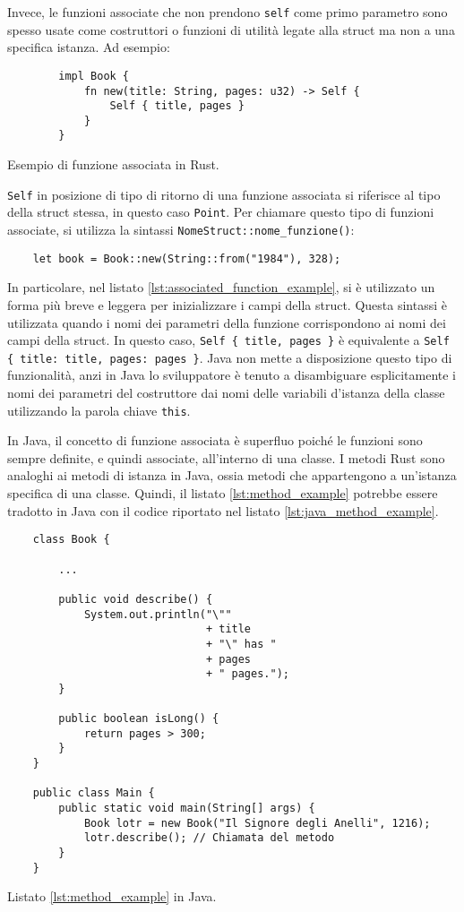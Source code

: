 Invece, le funzioni associate che non prendono \texttt{self} come primo parametro sono spesso usate come costruttori o funzioni di utilità legate alla struct ma non a una specifica istanza. Ad esempio:
\begin{listing}[H]
    \begin{verbatim}
        impl Book {
            fn new(title: String, pages: u32) -> Self {
                Self { title, pages }
            }
        }
    \end{verbatim}
    \caption{Esempio di funzione associata in Rust.}
    \label{lst:associated_function_example}
\end{listing}
\texttt{Self} in posizione di tipo di ritorno di una funzione associata si riferisce al tipo della struct stessa, in questo caso \texttt{Point}. Per chiamare questo tipo di funzioni associate, si utilizza la sintassi \texttt{NomeStruct::nome\_funzione()}:
\begin{verbatim}
    let book = Book::new(String::from("1984"), 328);
\end{verbatim}
In particolare, nel listato \ref{lst:associated_function_example}, si è utilizzato un forma più breve e leggera per inizializzare i campi della struct. Questa sintassi è utilizzata quando i nomi dei parametri della funzione corrispondono ai nomi dei campi della struct. In questo caso, \texttt{Self \{ title, pages \}} è equivalente a \texttt{Self \{ title: title, pages: pages \}}. Java non mette a disposizione questo tipo di funzionalità, anzi in Java lo sviluppatore è tenuto a disambiguare esplicitamente i nomi dei parametri del costruttore dai nomi delle variabili d'istanza della classe utilizzando la parola chiave \texttt{this}.

In Java, il concetto di funzione associata è superfluo poiché le funzioni sono sempre definite, e quindi associate, all'interno di una classe. I metodi Rust sono analoghi ai metodi di istanza in Java, ossia metodi che appartengono a un'istanza specifica di una classe. Quindi, il listato \ref{lst:method_example} potrebbe essere tradotto in Java con il codice riportato nel listato \ref{lst:java_method_example}.
\begin{listing}
\begin{verbatim}
    class Book {
        
        ...

        public void describe() {
            System.out.println("\"" 
                               + title 
                               + "\" has " 
                               + pages 
                               + " pages.");
        }

        public boolean isLong() {
            return pages > 300;
        }
    }

    public class Main {
        public static void main(String[] args) {
            Book lotr = new Book("Il Signore degli Anelli", 1216);
            lotr.describe(); // Chiamata del metodo
        }
    }
\end{verbatim}
    \caption{Listato \ref{lst:method_example} in Java.}
    \label{lst:java_method_example}
\end{listing}

